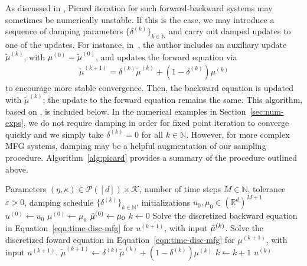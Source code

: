 \documentclass[11pt,reqno]{amsart}
\numberwithin{equation}{section}
\theoremstyle{plain}
\newcommand{\R}{\mathbb{R}}
\newcommand{\N}{\mathbb{N}}
\newcommand{\calK}{{\mathcal K}}
\newcommand{\calP}{{\mathcal P}}
\newcommand{\1}{\boldsymbol{\mathbbm{1}}}
\begin{document}
As discussed in \cite[Section 2.3]{Lauriere2021}, Picard iteration for such forward-backward systems may sometimes be numerically unstable. If this is the case, we may introduce a sequence of damping parameters $\{\delta^{(k)}\}_{k \in \N}$ and carry out damped updates to one of the updates. For instance, in~\cite{Lauriere2021}, the author includes an auxiliary update $\tilde{\mu}^{(k)}$, with $\mu^{(0)} = \tilde{\mu}^{(0)}$, and updates the forward equation via
\begin{align*}
    \tilde{\mu}^{(k + 1)} = \delta^{(k)} \tilde{\mu}^{(k)} + (1 - \delta^{(k)}) \mu^{(k)}
\end{align*}
to encourage more stable convergence. Then, the backward equation is updated with $\tilde{\mu}^{(k)}$; the update to the forward equation remains the same. This algorithm, based on \cite[Algorithm 1]{Lauriere2021}, is included below. In the numerical examples in Section~\ref{sec:num-exps}, we do not require damping in order for fixed point iteration to converge quickly and we simply take $\delta^{(k)} = 0$ for all $k \in \N$. However, for more complex MFG systems, damping may be a helpful augmentation of our sampling procedure. Algorithm~\ref{alg:picard} provides a summary of the procedure outlined above.
\begin{algorithm}[h]
\caption{Picard Iteration for Time-Discretized MFGs}\label{alg:picard}
\begin{algorithmic}[1]
\Require Parameters $(\eta, \kappa) \in \calP([d]) \times \calK$, number of time steps $M \in \N$, tolerance $\varepsilon > 0$, damping schedule $\{\delta^{(k)}\}_{k \in \N}$, initializations $u_0, \mu_0 \in (\R^{d})^{M + 1}$
\State $u^{(0)} \gets u_0$
\State $\mu^{(0)} \gets \mu_0$
\State $\Tilde{\mu}^{(0)} \gets \mu_0$
\State $k \gets 0$
\State Solve the discretized backward equation in Equation~\eqref{eqn:time-disc-mfg} for $u^{(k + 1)}$, with input $\Tilde{\mu}^{(k)}$.
\State Solve the discretized foward equation in Equation~\eqref{eqn:time-disc-mfg} for $\mu^{(k + 1)}$, with input $u^{(k+1)}$.
\State $\tilde{\mu}^{(k + 1)} \gets \delta^{(k)} \tilde{\mu}^{(k)} + (1 - \delta^{(k)}) \mu^{(k)}$
\State $k \gets k + 1$
\EndWhile
\State \Return $u^{(k)}$
\end{algorithmic}
\end{algorithm}
\end{document}
